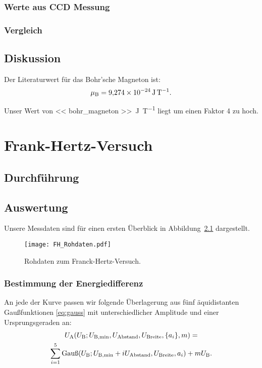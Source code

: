 \subsection{Werte aus CCD Messung}

\fehlt

\subsection{Vergleich}

\fehlt

\section{Diskussion}

Der Literaturwert für das Bohr'sche Magneton ist:
\parencite{wikipedia/Bohr_Magneton} \parencite[Umschlag]{meschede-gerthsen_24}
\[
    \mu_\text B = \SI{9.274e-24}{\joule\per\tesla}.
\]

Unser Wert von \SI{<< bohr_magneton >>}{\joule\per\tesla} liegt um einen Faktor
4 zu hoch.

\chapter{Frank-Hertz-Versuch}

\section{Durchführung}

\section{Auswertung}

Unsere Messdaten sind für einen ersten Überblick in
Abbildung~\ref{fig:FH_Rohdaten} dargestellt.

\begin{figure}[htbp]
    \centering
    \texttt{[image: FH\_Rohdaten.pdf]}
    \caption{%
        Rohdaten zum Franck-Hertz-Versuch.
    }
    \label{fig:FH_Rohdaten}
\end{figure}

\subsection{Bestimmung der Energiedifferenz}

An jede der Kurve passen wir folgende Überlagerung aus fünf äquidistanten
Gaußfunktionen \eqref{eq:gauss} mit unterschiedlicher Amplitude und einer
Ursprungsgeraden an:
\begin{multline*}
    U_\text A (U_\text B; U_{\text B, \text{min}}, U_\text{Abstand}, U_\text{Breite}, \{a_i\}, m)
    = \\
    \sum_{i=1}^5 \mathop{\text{Gauß}} (U_\text B; U_{\text B, \text{min}} + i
    U_\text{Abstand}, U_\text{Breite}, a_i)
    +
    m U_\text B.
\end{multline*}

